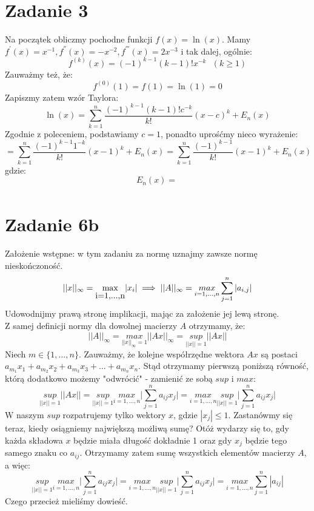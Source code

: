 \documentclass{article}
\begin{document}
\section*{Zadanie 3}

Na początek obliczmy pochodne funkcji $f(x) = \ln(x)$. Mamy $f^{'}(x) = x^{-1}, f^{''}(x) = -x^{-2}, f^{'''}(x) = 2x^{-3}$ i tak dalej, ogólnie:
$$f^{(k)}(x) = (-1)^{k-1}(k-1)!x^{-k} \ \ \ (k \geq 1)$$
Zauważmy też, że:
$$f^{(0)}(1) = f(1) = \ln(1) = 0$$
Zapiszmy zatem wzór Taylora:
$$\ln(x) = \sum_{k=1}^{n} \frac{(-1)^{k-1}(k-1)!c^{-k}}{k!} (x-c)^k + E_n(x)$$
Zgodnie z poleceniem, podstawiamy $c = 1$, ponadto uprośćmy nieco wyrażenie:
$$= \sum_{k=1}^{n} \frac{(-1)^{k-1}1^{-k}}{k!}(x-1)^k + E_n(x) = \sum_{k=1}^{n} \frac{(-1)^{k-1}}{k!}(x-1)^k + E_n(x)$$
gdzie:
$$E_n(x) = \frac{}{}$$

\section*{Zadanie 6b}
Założenie wstępne: w tym zadaniu za normę uznajmy zawsze normę nieskończoność.
$$||x||_{\infty} =  \stackunder{max}{i=1,...,n} |x_i| \implies ||A||_\infty = \underset{i = 1,...,n}{max} \sum_{j=1}^{n} |a_{i,j}|$$
Udowodnijmy prawą stronę implikacji, mając za założenie jej lewą stronę. \\
Z samej definicji normy dla dowolnej macierzy $A$ otrzymamy, że: 
$$||A||_{\infty} = \underset{||x||_{\infty} = 1}{max} ||Ax||_{\infty} = \underset{||x|| = 1}{sup} ||Ax||$$
Niech $m \in \{1, ..., n\}$. Zauważmy, że kolejne współrzędne wektora $Ax$ są postaci $a_{m_1}x_1 + a_{m_2}x_2 + a_{m_3}x_3 + ... + a_{m_n}x_n$. Stąd otrzymamy pierwszą poniższą równość, którą dodatkowo możemy "odwrócić" - zamienić ze sobą $sup$ i $max$:
$$\underset{||x|| = 1}{sup} ||Ax||=
    \underset{||x|| = 1}{sup} \underset{i = 1, ..., n}{max}\Big|\sum_{j=1}^{n}a_{ij}x_j \Big| =
     \underset{i = 1, ..., n}{max}\underset{||x|| = 1}{sup}\Big|\sum_{j=1}^{n}a_{ij}x_j \Big|
$$
W naszym $sup$ rozpatrujemy tylko wektory $x$, gdzie $|x_j| \leq 1$. Zastanówmy się teraz, kiedy osiągniemy największą możliwą sumę? Otóż wydarzy się to, gdy każda składowa $x$ będzie miała długość dokładnie 1 oraz gdy $x_j$ będzie tego samego znaku co $a_{ij}$. Otrzymamy zatem sumę wszystkich elementów macierzy $A$, a więc:
$$
    \underset{||x|| = 1}{sup} \underset{i = 1, ..., n}{max}\Big|\sum_{j=1}^{n}a_{ij}x_j \Big| =
     \underset{i = 1, ..., n}{max}\underset{||x|| = 1}{sup}\Big|\sum_{j=1}^{n}a_{ij}x_j \Big| = \underset{i = 1, ..., n}{max} \sum_{j=1}^{n}|a_{ij}| $$
Czego przecież mieliśmy dowieść.
\end{document}
